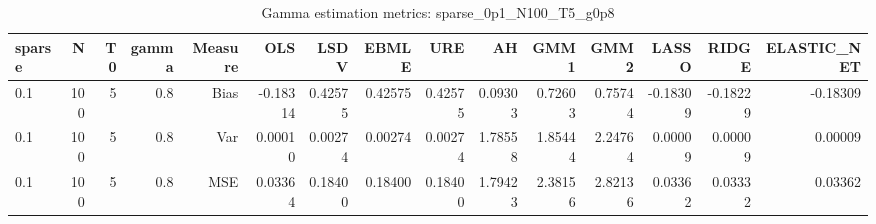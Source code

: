 \begin{table}[!htbp]\centering
\caption{Gamma estimation metrics: sparse_0p1_N100_T5_g0p8}
\label{tab:table1_sparse_0p1_N100_T5_g0p8}
\begin{tabular}{lrrrrrrrrrrrrrr}
\hline
sparse & N & T0 & gamma & Measure & OLS & LSDV & EBMLE & URE & AH & GMM1 & GMM2 & LASSO & RIDGE & ELASTIC_NET \\
\hline
0.1 & 100 & 5 & 0.8 & Bias & -0.18314 & 0.42575 & 0.42575 & 0.42575 & 0.09303 & 0.72603 & 0.75744 & -0.18309 & -0.18229 & -0.18309 \\
0.1 & 100 & 5 & 0.8 & Var & 0.00010 & 0.00274 & 0.00274 & 0.00274 & 1.78558 & 1.85444 & 2.24764 & 0.00009 & 0.00009 & 0.00009 \\
0.1 & 100 & 5 & 0.8 & MSE & 0.03364 & 0.18400 & 0.18400 & 0.18400 & 1.79423 & 2.38156 & 2.82136 & 0.03362 & 0.03332 & 0.03362 \\
\hline
\end{tabular}
\end{table}

